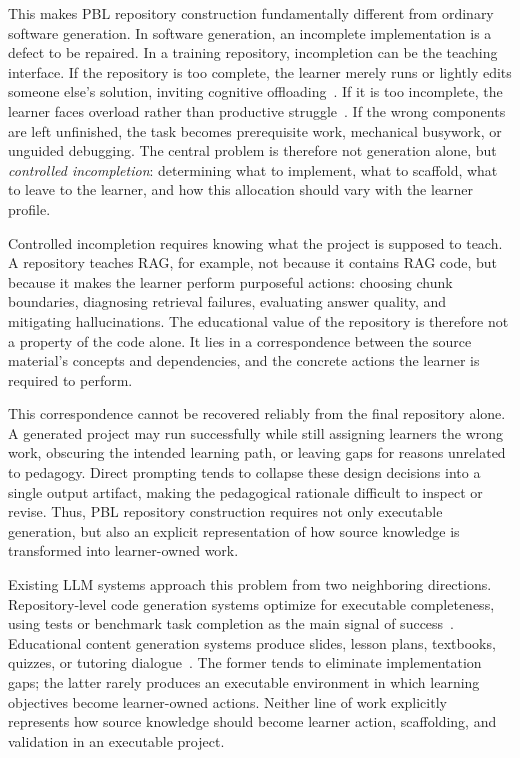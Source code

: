 \documentclass[11pt]{article}
\begin{document}
\noindent
This makes PBL repository construction fundamentally different from ordinary software generation.
In software generation, an incomplete implementation is a defect to be repaired.
In a training repository, incompletion can be the teaching interface.
If the repository is too complete, the learner merely runs or lightly edits someone else's solution, inviting cognitive offloading~\cite{kelly2019cognitive,armitage2025offloading}.
If it is too incomplete, the learner faces overload rather than productive struggle~\cite{kapur2008productive,bjork2011desirable}.
If the wrong components are left unfinished, the task becomes prerequisite work, mechanical busywork, or unguided debugging.
The central problem is therefore not generation alone, but \emph{controlled incompletion}: determining what to implement, what to scaffold, what to leave to the learner, and how this allocation should vary with the learner profile.

\noindent
Controlled incompletion requires knowing what the project is supposed to teach.
A repository teaches RAG, for example, not because it contains RAG code, but because it makes the learner perform purposeful actions: choosing chunk boundaries, diagnosing retrieval failures, evaluating answer quality, and mitigating hallucinations.
The educational value of the repository is therefore not a property of the code alone.
It lies in a correspondence between the source material's concepts and dependencies, and the concrete actions the learner is required to perform.

\noindent
This correspondence cannot be recovered reliably from the final repository alone.
A generated project may run successfully while still assigning learners the wrong work, obscuring the intended learning path, or leaving gaps for reasons unrelated to pedagogy.
Direct prompting tends to collapse these design decisions into a single output artifact, making the pedagogical rationale difficult to inspect or revise.
Thus, PBL repository construction requires not only executable generation, but also an explicit representation of how source knowledge is transformed into learner-owned work.

\noindent
Existing LLM systems approach this problem from two neighboring directions.
Repository-level code generation systems optimize for executable completeness, using tests or benchmark task completion as the main signal of success~\cite{qian2023chatdev,hong2023metagpt,yang2024sweagent,wang2024openhands,jimenez2023swebench,li2024deveval}.
Educational content generation systems produce slides, lesson plans, textbooks, quizzes, or tutoring dialogue~\cite{zheng2025pptagent,sharma2025pustakai,zhang2024simclass,cohn2026edf}.
The former tends to eliminate implementation gaps; the latter rarely produces an executable environment in which learning objectives become learner-owned actions.
Neither line of work explicitly represents how source knowledge should become learner action, scaffolding, and validation in an executable project.
\end{document}
